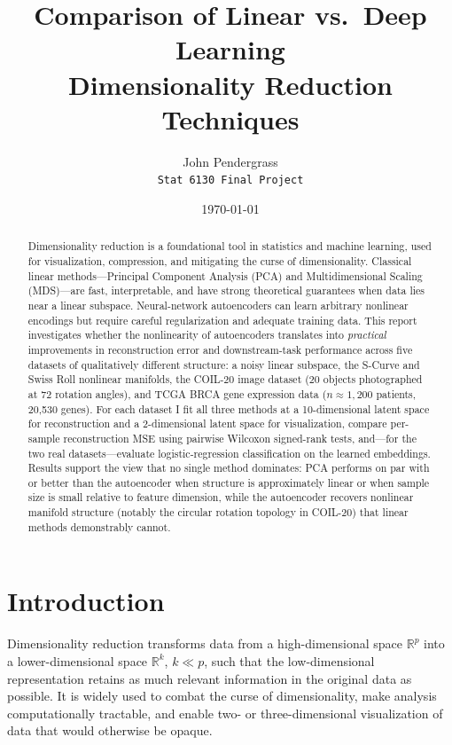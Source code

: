 \documentclass[11pt]{article}
\title{\textbf{Comparison of Linear vs.\ Deep Learning\\ Dimensionality Reduction Techniques}}
\author{John Pendergrass \\ \texttt{Stat 6130 Final Project}}
\date{\today}
\begin{document}
\maketitle

\begin{abstract}
\noindent
Dimensionality reduction is a foundational tool in statistics and machine learning, used for visualization, compression, and mitigating the curse of dimensionality. Classical linear methods---Principal Component Analysis (PCA) and Multidimensional Scaling (MDS)---are fast, interpretable, and have strong theoretical guarantees when data lies near a linear subspace. Neural-network autoencoders can learn arbitrary nonlinear encodings but require careful regularization and adequate training data. This report investigates whether the nonlinearity of autoencoders translates into \emph{practical} improvements in reconstruction error and downstream-task performance across five datasets of qualitatively different structure: a noisy linear subspace, the S-Curve and Swiss Roll nonlinear manifolds, the COIL-20 image dataset (20 objects photographed at 72 rotation angles), and TCGA BRCA gene expression data ($n \approx 1{,}200$ patients, 20{,}530 genes). For each dataset I fit all three methods at a 10-dimensional latent space for reconstruction and a 2-dimensional latent space for visualization, compare per-sample reconstruction MSE using pairwise Wilcoxon signed-rank tests, and---for the two real datasets---evaluate logistic-regression classification on the learned embeddings. Results support the view that no single method dominates: PCA performs on par with or better than the autoencoder when structure is approximately linear or when sample size is small relative to feature dimension, while the autoencoder recovers nonlinear manifold structure (notably the circular rotation topology in COIL-20) that linear methods demonstrably cannot.
\end{abstract}

\section{Introduction}

Dimensionality reduction transforms data from a high-dimensional space $\mathbb{R}^p$ into a lower-dimensional space $\mathbb{R}^k$, $k \ll p$, such that the low-dimensional representation retains as much relevant information in the original data as possible. It is widely used to combat the curse of dimensionality, make analysis computationally tractable, and enable two- or three-dimensional visualization of data that would otherwise be opaque.
\end{document}
